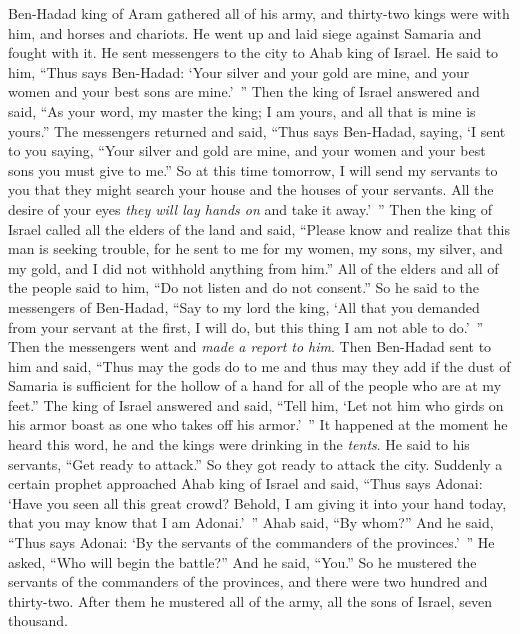 \begin{biblechapter} %
 Ben-Hadad king of Aram gathered all of his army, and thirty-two kings were with him, and horses and chariots. He went up and laid siege against Samaria and fought with it.
\verse He sent messengers to the city to Ahab king of Israel.
\verse He said to him, “Thus says Ben-Hadad: ‘Your silver and your gold are mine, and your women and your best sons are mine.’ ”
\verse Then the king of Israel answered and said, “As your word, my master the king; I am yours, and all that is mine is yours.”
\verse The messengers returned and said, “Thus says Ben-Hadad, saying, ‘I sent to you saying, “Your silver and gold are mine, and your women and your best sons you must give to me.”
\verse So at this time tomorrow, I will send my servants to you that they might search your house and the houses of your servants. All the desire of your eyes \textit{they will lay hands on} and take it away.’ ”
\verse Then the king of Israel called all the elders of the land and said, “Please know and realize that this man is seeking trouble, for he sent to me for my women, my sons, my silver, and my gold, and I did not withhold anything from him.”
\verse All of the elders and all of the people said to him, “Do not listen and do not consent.”
\verse So he said to the messengers of Ben-Hadad, “Say to my lord the king, ‘All that you demanded from your servant at the first, I will do, but this thing I am not able to do.’ ” Then the messengers went and \textit{made a report to him}.
\verse Then Ben-Hadad sent to him and said, “Thus may the gods do to me and thus may they add if the dust of Samaria is sufficient for the hollow of a hand for all of the people who are at my feet.”
\verse The king of Israel answered and said, “Tell him, ‘Let not him who girds on his armor boast as one who takes off his armor.’ ”
\verse It happened at the moment he heard this word, he and the kings were drinking in the \textit{tents}. He said to his servants, “Get ready to attack.” So they got ready to attack the city.
\verse Suddenly a certain prophet approached Ahab king of Israel and said, “Thus says Adonai: ‘Have you seen all this great crowd? Behold, I am giving it into your hand today, that you may know that I am Adonai.’ ”
\verse Ahab said, “By whom?” And he said, “Thus says Adonai: ‘By the servants of the commanders of the provinces.’ ” He asked, “Who will begin the battle?” And he said, “You.”
\verse So he mustered the servants of the commanders of the provinces, and there were two hundred and thirty-two. After them he mustered all of the army, all the sons of Israel, seven thousand.

\end{biblechapter}
